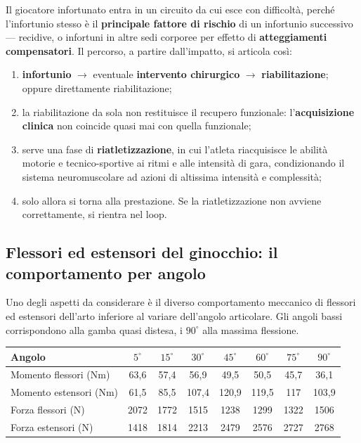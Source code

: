 Il giocatore infortunato entra in un circuito da cui esce con difficoltà, perché l'infortunio stesso
è il \textbf{principale fattore di rischio} di un infortunio successivo --- recidive, o infortuni in
altre sedi corporee per effetto di \textbf{atteggiamenti compensatori}. Il percorso, a partire
dall'impatto, si articola così:
\begin{enumerate}
  \item \textbf{infortunio} $\rightarrow$ eventuale \textbf{intervento chirurgico} $\rightarrow$
    \textbf{riabilitazione}; oppure direttamente riabilitazione;
  \item la riabilitazione da sola non restituisce il recupero funzionale: l'\textbf{acquisizione
    clinica} non coincide quasi mai con quella funzionale;
  \item serve una fase di \textbf{riatletizzazione}, in cui l'atleta riacquisisce le abilità motorie
    e tecnico-sportive ai ritmi e alle intensità di gara, condizionando il sistema neuromuscolare ad
    azioni di altissima intensità e complessità;
  \item solo allora si torna alla prestazione. Se la riatletizzazione non avviene correttamente, si
    rientra nel loop.
\end{enumerate}

\subsection{Flessori ed estensori del ginocchio: il comportamento per angolo}

Uno degli aspetti da considerare è il diverso comportamento meccanico di flessori ed estensori
dell'arto inferiore al variare dell'angolo articolare. Gli angoli bassi corrispondono alla gamba
quasi distesa, i $90^\circ$ alla massima flessione.

\begin{table}[htbp]
  \centering
  \small
  \renewcommand{\arraystretch}{1.3}
  \begin{tabularx}{\textwidth}{|X|c|c|c|c|c|c|c|}
    \hline
    \textbf{Angolo} & $5^\circ$ & $15^\circ$ & $30^\circ$ & $45^\circ$ & $60^\circ$ & $75^\circ$ &
      $90^\circ$ \\
    \hline
    Momento flessori (Nm) & 63,6 & 57,4 & 56,9 & 49,5 & 50,5 & 45,7 & 36,1 \\
    \hline
    Momento estensori (Nm) & 61,5 & 85,5 & 107,4 & 120,9 & 119,5 & 117 & 103,9 \\
    \hline
    Forza flessori (N) & 2072 & 1772 & 1515 & 1238 & 1299 & 1322 & 1506 \\
    \hline
    Forza estensori (N) & 1418 & 1814 & 2213 & 2479 & 2576 & 2727 & 2768 \\
    \hline
  \end{tabularx}
\end{table}

